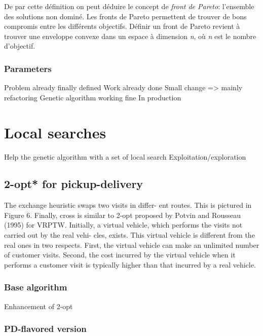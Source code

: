 \documentclass[12pt]{memoir}
\begin{document}

De par cette définition on peut déduire le concept de \emph{front de
Pareto}: l'ensemble des solutions non dominé. Les fronts de Pareto
permettent de trouver de bons compromis entre les différents objectifs.
Définir un front de Pareto revient à trouver une enveloppe convexe\cite{godfrey2007algorithms} dans
un espace à dimension \textit{n}, où \textit{n} est le nombre d'objectif.

\label{par:Multi-objective selection }

\subsubsection{Parameters} %
\label{ssub:Parameter}

Problem already finally defined 
Work already done
Small change => mainly refactoring
Genetic algorithm working fine 
In production

\section{Local searches}
Help the genetic algorithm with a set of local search
Exploitation/exploration
\subsection{2-opt* for pickup-delivery}
The exchange heuristic swaps two visits in differ-
ent routes. This is pictured in Figure 6. Finally, cross
is similar to 2-opt {\*}
proposed by Potvin and Rousseau
(1995) for VRPTW. Initially, a virtual vehicle, which
performs the visits not carried out by the real vehi-
cles, exists. This virtual vehicle is different from the
real  ones  in  two  respects.  First,  the  virtual  vehicle
can  make  an  unlimited  number  of  customer  visits.
Second, the cost incurred by the virtual vehicle when
it performs a customer visit is typically higher than
that incurred by a real vehicle.
\subsubsection{Base algorithm}
Enhancement of 2-opt
\subsubsection{PD-flavored version}
\end{document}
